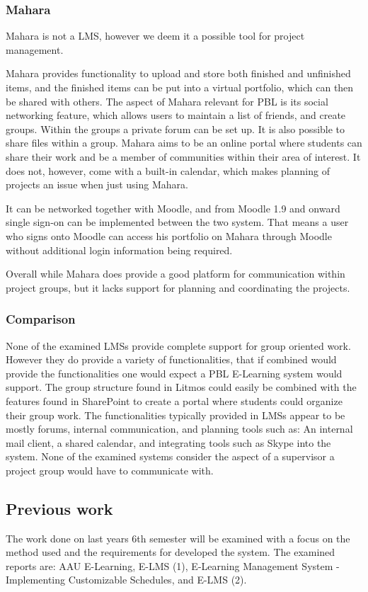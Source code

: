 \subsubsection{Mahara}
Mahara is not a LMS, however we deem it a possible tool for project management.

Mahara provides functionality to upload and store both finished and unfinished items, and the finished items can be put into a virtual portfolio, which can then be shared with others.
The aspect of Mahara relevant for PBL is its social networking feature, which allows users to maintain a list of friends, and create groups.
Within the groups a private forum can be set up. 
It is also possible to share files within a group.
Mahara aims to be an online portal where students can share their work and be a member of communities within their area of interest.
It does not, however, come with a built-in calendar, which makes planning of projects an issue when just using Mahara.

It can be networked together with Moodle, and from Moodle 1.9 and onward single sign-on can be implemented between the two system.
That means a user who signs onto Moodle can access his portfolio on Mahara through Moodle without additional login information being required.

Overall while Mahara does provide a good platform for communication within project groups, but it lacks support for planning and coordinating the projects.

\subsubsection{Comparison}
None of the examined LMSs provide complete support for group oriented work.
However they do provide a variety of functionalities, that if combined would provide the functionalities one would expect a PBL E-Learning system would support.
The group structure found in Litmos could easily be combined with the features found in SharePoint to create a portal where students could organize their group work.
The functionalities typically provided in LMSs appear to be mostly forums, internal communication, and planning tools such as: An internal mail client, a shared calendar, and integrating tools such as Skype into the system.
None of the examined systems consider the aspect of a supervisor a project group would have to communicate with.

\subsection{Previous work}
The work done on last years 6th semester will be examined with a focus on the method used and the requirements for developed the system. 
The examined reports are: AAU E-Learning, E-LMS (1), E-Learning Management System - Implementing Customizable Schedules, and E-LMS (2).


